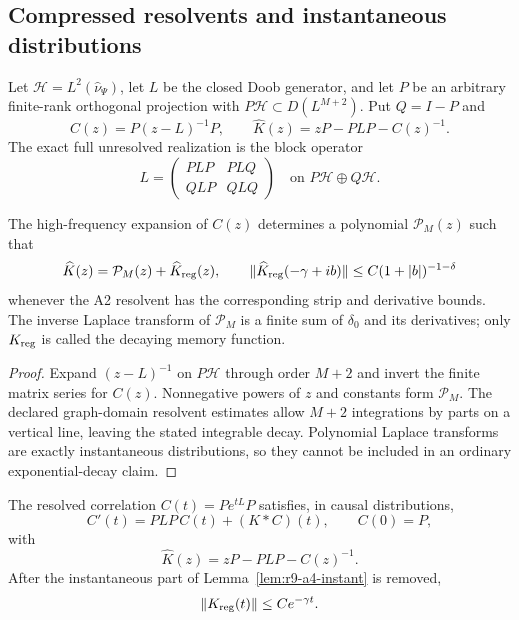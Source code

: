 \subsection{Compressed resolvents and instantaneous distributions}

Let $\mathcal H=L^2(\widehat\nu_\Psi)$, let $L$ be the closed Doob generator,
and let $P$ be an arbitrary finite-rank orthogonal projection with
$P\mathcal H\subset D(L^{M+2})$.  Put $Q=I-P$ and
\[
 C(z)=P(z-L)^{-1}P,
 \qquad
 \widehat K(z)=zP-PLP-C(z)^{-1}.
\]
The exact full unresolved realization is the block operator
\[
 L=\begin{pmatrix}PLP&PLQ\\QLP&QLQ\end{pmatrix}
 \quad\text{on }P\mathcal H\oplus Q\mathcal H.
\]

\begin{lemma}
\label{lem:r9-a4-instant}
The high-frequency expansion of $C(z)$ determines a polynomial
$\mathcal P_M(z)$ such that
\[
 \widehat K(z)=\mathcal P_M(z)+\widehat K_{\rm reg}(z),
 \qquad
 \|\widehat K_{\rm reg}(-\gamma+ib)\|
 \le C(1+|b|)^{-1-\delta}
\]
whenever the A2 resolvent has the corresponding strip and derivative bounds.
The inverse Laplace transform of $\mathcal P_M$ is a finite sum of
$\delta_0$ and its derivatives; only $K_{\rm reg}$ is called the decaying
memory function.
\end{lemma}

\begin{proof}
Expand $(z-L)^{-1}$ on $P\mathcal H$ through order $M+2$ and invert the finite
matrix series for $C(z)$.  Nonnegative powers of $z$ and constants form
$\mathcal P_M$.  The declared graph-domain resolvent estimates allow
$M+2$ integrations by parts on a vertical line, leaving the stated integrable
decay.  Polynomial Laplace transforms are exactly instantaneous distributions,
so they cannot be included in an ordinary exponential-decay claim.
\end{proof}

\begin{theorem}
\label{thm:r9-a4-memory}
The resolved correlation $C(t)=Pe^{tL}P$ satisfies, in causal distributions,
\[
 C'(t)=PLP\,C(t)+(K*C)(t),
 \qquad C(0)=P,
\]
with
\[
 \widehat K(z)=zP-PLP-C(z)^{-1}.
\]
After the instantaneous part of
Lemma~\ref{lem:r9-a4-instant} is removed,
\[
 \|K_{\rm reg}(t)\|\le Ce^{-\gamma t}.
\]
\end{theorem}

